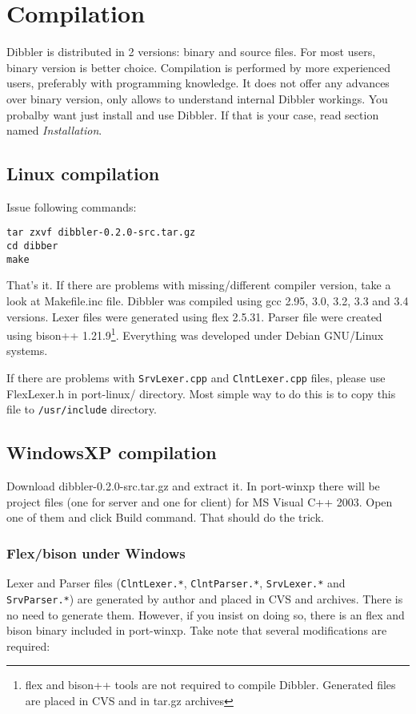 \section{Compilation}
Dibbler is distributed in 2 versions: binary and source files. For
most users, binary version is better choice.  Compilation is
performed by more experienced users, preferably with programming
knowledge. It does not offer any advances over binary version, only
allows to understand internal Dibbler workings. You probalby want just
install and use Dibbler. If that is your case, read section
named \emph{Installation}.

\subsection{Linux compilation}
Issue following commands:
\begin{verbatim}
tar zxvf dibbler-0.2.0-src.tar.gz
cd dibber
make
\end{verbatim}
That's it. If there are problems with missing/different compiler
version, take a look at Makefile.inc file. Dibbler was compiled using
gcc 2.95, 3.0, 3.2, 3.3 and 3.4 versions. Lexer files were generated using
flex 2.5.31. Parser file were created using bison++
1.21.9\footnote{flex and bison++ tools are not required to compile
  Dibbler. Generated files are placed in CVS and in tar.gz
  archives}. Everything was developed under Debian GNU/Linux systems.

If there are problems with \verb+SrvLexer.cpp+ and
\verb+ClntLexer.cpp+ files, please use FlexLexer.h in port-linux/
directory. Most simple way to do this is to copy this file to
\verb+/usr/include+ directory.

\subsection{WindowsXP compilation}
Download dibbler-0.2.0-src.tar.gz and extract it. In port-winxp there
will be project files (one for server and one for client) for MS
Visual C++ 2003. Open one of them and click Build command. That should
do the trick.

\subsubsection{Flex/bison under Windows}

Lexer and Parser files (\verb+ClntLexer.*+, \verb+ClntParser.*+, \verb+SrvLexer.*+ and
\verb+SrvParser.*+) are generated by author and placed in CVS and
archives. There is no need to generate them. However, if you insist on
doing so, there is an flex and bison binary included in port-winxp. Take note that
several modifications are required:

